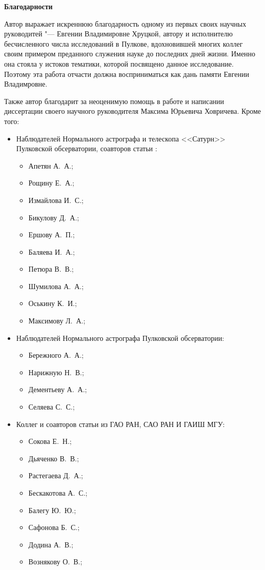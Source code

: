 \newpage
\begin{center}
\textbf{Благодарности}
\end{center}


Автор выражает искреннюю благодарность одному из первых своих научных руководитей "--- Евгении Владимировне Хруцкой, автору и исполнителю бесчисленного числа исследований в Пулкове, вдохновившей многих коллег своим примером преданного служения науке до последних дней жизни. Именно она стояла у истоков тематики, которой посвящено данное исследование. Поэтому эта работа отчасти должна восприниматься как дань памяти Евгении Владимровне.

Также автор благодарит за неоценимую помощь в работе и написании диссертации своего научного руководителя Максима Юрьевича Ховричева. Кроме того:
\begin{itemize}
  \item Наблюдателей Нормального астрографа и телескопа <<Сатурн>> Пулковской обсерватории, соавторов статьи \cite{2018AstL...44..103K}:
  \begin{itemize}
    \item Апетян А.~А.;
    \item Рощину Е.~А.;
    \item Измайлова И.~С.;
    \item Бикулову Д.~А.;
    \item Ершову А.~П.;
    \item Баляева И.~А.;
    \item Петюра В.~В.;
    \item Шумилова А.~А.;
    \item Оськину К.~И.;
    \item Максимову Л.~А.;
  \end{itemize}
  \item Наблюдателей Нормального астрографа Пулковской обсерватории:
  \begin{itemize}
    \item Бережного А.~А.;
    \item Нарижную Н.~В.;
    \item Дементьеву А.~А.;
    \item Селяева С.~С.;
  \end{itemize}
  \item Коллег и соавторов статьи \cite{2016AstL...42..686K} из ГАО РАН, САО РАН И ГАИШ МГУ:
  \begin{itemize}
    \item Сокова Е.~Н.;
    \item Дьяченко В.~В.;
    \item Растегаева Д.~А.;
    \item Бескакотова А.~С.;
    \item Балегу Ю.~Ю.;
    \item Сафонова Б.~С.;
    \item Додина А.~В.;
    \item Вознякову О.~В.;
  \end{itemize}
\end{itemize}
